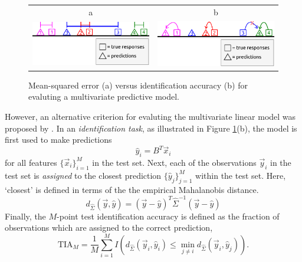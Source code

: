 \begin{figure}
\centering
\begin{tabular}{cc}
a & b\\
\includegraphics[scale = 0.3]{../../diagram/idloss2a.png} &
\includegraphics[scale = 0.3]{../../diagram/idloss2b.png} \\
\end{tabular}
\caption{Mean-squared error (a) versus identification accuracy (b) for
  evaluting a multivariate predictive model.}
\label{fig:mse_vs_ia}
\end{figure}

However, an alternative criterion for evaluting the multivariate
linear model was proposed by \cite{Kay2008a}.  In an
\emph{identification task}, as illustrated in Figure
\ref{fig:mse_vs_ia}(b), the model is first used to make predictions
\[
\hat{y}_i = B^T \vec{x}_i
\]
for all features $\{\vec{x}_i\}_{i=1}^M$ in the test set. Next, each of the
observations $\vec{y}_i$ in the test set is \emph{assigned} to the
closest prediction $\{\hat{y}_j\}_{j=1}^M$ within the test set.
Here, `closest' is defined in terms of the 
the empirical Mahalanobis distance.
\[
d_{\hat{\Sigma}}(\vec{y}, \hat{y}) = (\vec{y} - \hat{y})^T \hat{\Sigma}^{-1} (\vec{y}-\hat{y})
\]
Finally, the $M$-point test identification accuracy is defined as the fraction
of observations which are assigned to the correct prediction,
\[
\text{TIA}_M = \frac{1}{M}\sum_{i=1}^M I(d_{\hat{\Sigma}}(\vec{y}_i, \hat{y}_i) \leq \min_{j \neq i} d_{\hat{\Sigma}}(\vec{y}_i, \hat{y}_j)).
\]

